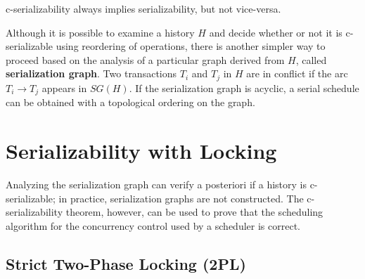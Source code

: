 c-serializability always implies serializability, but not vice-versa.

Although it is possible to examine a history $H$ and decide whether or not it is c-serializable using reordering of operations, there is another simpler way to proceed based on the analysis of a particular graph derived from $H$, called \textbf{serialization graph}.
Two transactions $T_i$ and $T_j$ in $H$ are in conflict if the arc $T_i \rightarrow T_j$ appears in $SG(H)$.
If the serialization graph is acyclic, a serial schedule can be obtained with a topological ordering on the graph.

\section{Serializability with Locking}

Analyzing the serialization graph can verify a posteriori if a history is c-serializable; in practice, serialization graphs are not constructed. The c-serializability theorem, however, can be used to prove that the scheduling algorithm for the concurrency control used by a scheduler is correct.

\subsection{Strict Two-Phase Locking (2PL)}

